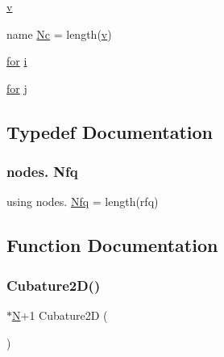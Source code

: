 \begin{DoxyCompactItemize}
\item 
\hyperlink{a00473_ac4055e3a20b6b3af3d10590ea446ef6c}{v}
\item 
name \hyperlink{a00473_ae3962c98d9f11354a4d6ecf7fbd3f5b6}{Nc} = length(\hyperlink{a00605_ac4055e3a20b6b3af3d10590ea446ef6c}{v})
\item 
\hyperlink{a00623_ad1e7380d51df1e0043d24d3c8a860e0a}{for} \hyperlink{a00473_a2e4ce9aeeb12bfcdb92dae2a4692c8fb}{i}
\item 
\hyperlink{a00623_ad1e7380d51df1e0043d24d3c8a860e0a}{for} \hyperlink{a00473_ac86694252f8dfdb19aaeadc4b7c342c6}{j}
\end{DoxyCompactItemize}


\subsection{Typedef Documentation}
\mbox{\label{a00473_a48bce0fe5ec77a5530854f31d096cf97}} 
\subsubsection{\texorpdfstring{nodes. Nfq}{nodes. Nfq}}
{\footnotesize\ttfamily using nodes.
    \hyperlink{a01014_a8e84225359762b34b0c20c9e75fc53b1}{Nfq} =  length(rfq)}



\subsection{Function Documentation}
\mbox{\label{a00473_ad944bbd4c17e82aa32dbac520e9a4d6b}} 
\subsubsection{\texorpdfstring{Cubature2\+D()}{Cubature2D()}}
{\footnotesize{}$\ast$\hyperlink{a00473_a5b9c4563028063ee53b517cce9aa701b}{N}+1 Cubature2D (\begin{DoxyParamCaption}{ }\end{DoxyParamCaption})\hspace{0.3cm}{\ttfamily [virtual]}}

